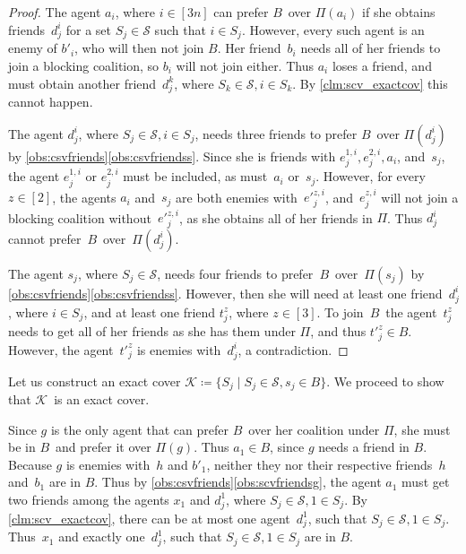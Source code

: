 \documentclass[a4paper,fleqn]{cas-sc}
\newcommand{\partition}{\ensuremath{\Pi}\xspace}
\newcommand{\blockingCoalition}{\ensuremath{B}\xspace}
\newcommand{\sets}{\ensuremath{\mathcal{S}}}
\newcommand{\elements}{\ensuremath{[3n]}}
\newcommand{\sset}[1]{\ensuremath{S_{#1}}}
\newcommand{\ecov}{\ensuremath{\mathcal{K}}}
\begin{document}
{\begin{proof}
The agent $a_i$, where $i \in \elements$ can prefer \blockingCoalition\ over $\partition(a_i)$ if she obtains friends~$d^i_j$ for a set $\sset j \in \sets$ such that $i \in \sset j$.
However, every such agent is an enemy of $b'_i$, who will then not join \blockingCoalition. Her friend~$b_i$ needs all of her friends to join a blocking coalition, so $b_i$ will not join either.
Thus $a_i$ loses a friend, and must obtain another friend~$d^k_j$, where $\sset k \in \sets, i \in \sset k$. By \cref{clm:scv_exactcov} this cannot happen.

The agent $d^i_j$, where $\sset j \in \sets, i \in \sset j$, needs three friends to prefer \blockingCoalition\ over $\partition(d^i_j)$ by \cref{obs:csvfriends}\eqref{obs:csvfriendss}. Since she is friends with $e^{1,i}_j, e^{2,i}_j, a_i$, and~$s_j$, the agent $e^{1,i}_j$ or $e^{2,i}_j$ must be included, as must~$a_i$ or~$s_j$. However, for every $z \in [2]$, the agents $a_i$ and~$s_j$ are both enemies with~$e'^{z,i}_j$, and~$e^{z,i}_j$ will not join a blocking coalition without~$e'^{z,i}_j$, as she obtains all of her friends in \partition. Thus $d^i_j$ cannot prefer~\blockingCoalition\ over~$\partition(d^i_j)$.

The agent $s_j$, where $\sset j \in \sets$, needs four friends to prefer~\blockingCoalition\ over~$\partition(s_j)$ by \cref{obs:csvfriends}\eqref{obs:csvfriendss}.
However, then she will need at least one friend~$d^i_j$, where $i \in \sset j$, and at least one friend $t^z_j$, where $z \in [3]$. To join~\blockingCoalition\ the agent~$t^z_j$ needs to get all of her friends as she has them under \partition, and thus $t'^z_j \in \blockingCoalition$. However, the agent~$t'^z_j$ is enemies with~$d^i_j$, a contradiction.
\end{proof}


Let us construct an exact cover $\ecov \coloneqq \{\sset j \mid \sset j \in \sets, s_j \in \blockingCoalition\}$.
We proceed to show that \ecov\ is an exact cover.

Since $g$ is the only agent that can prefer \blockingCoalition\ over her coalition under \partition, she must be in \blockingCoalition\ and prefer it over $\partition(g)$.
Thus $a_1 \in \blockingCoalition$, since $g$ needs a friend in \blockingCoalition.
Because $g$ is enemies with~$h$ and $b'_1$, neither they nor their respective friends~$h$ and~$b_1$ are in \blockingCoalition.
Thus by \cref{obs:csvfriends}\eqref{obs:scvfriendsg}, the agent $a_1$ must get two friends among the agents $x_1$ and $d^1_j$, where $\sset j \in \sets, 1 \in \sset j$.
By \cref{clm:scv_exactcov}, there can be at most one agent~$d^1_j$, such that $\sset j \in \sets, 1 \in \sset j$.
Thus~$x_1$ and exactly one~$d^1_j$, such that $\sset j \in \sets, 1 \in \sset j$ are in \blockingCoalition.

}
\end{document}
